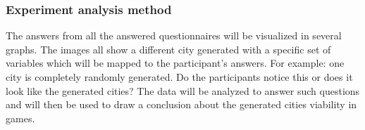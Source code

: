 	\subsubsection{Experiment analysis method}
	The answers from all the answered questionnaires will be visualized in several graphs. The images all show a different city generated with a specific set of variables which will be mapped to the participant’s answers. For example: one city is completely randomly generated. Do the participants notice this or does it look like the generated cities?
	The data will be analyzed to answer such questions and will then be used to draw a conclusion about the generated cities viability in games.
	
	
	
	